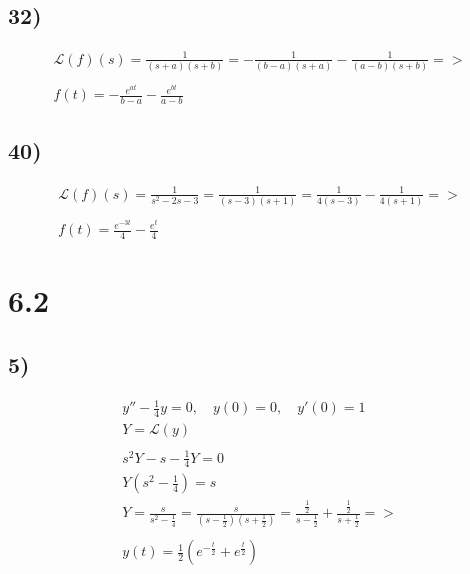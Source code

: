 \documentclass{article}
\newcommand{\paranth}[1]{\left( #1 \right)}
\newcommand{\laplace}[1]{\mathcal{L}\paranth{#1}}
\begin{document}
\subsection*{32)}

\begin{gather*}
	\laplace{f} \paranth{s} =
	\frac{1}{\paranth{s + a} \paranth{s + b}} =
	-\frac{1}{\paranth{b - a} \paranth{s + a}} - \frac{1}{\paranth{a - b} \paranth{s + b}} => \\ \\
	f\paranth{t} =
	-\frac{e^{a t}}{b - a}
	-\frac{e^{b t}}{a - b}
\end{gather*}


\subsection*{40)}

\begin{gather*}
	\laplace{f} (s) =
	\frac{1}{s^2 - 2 s - 3} =
	\frac{1}{\paranth{s - 3} \paranth{s + 1}} =
	\frac{1}{4 \paranth{s - 3}} - \frac{1}{4 \paranth{s + 1}} => \\ \\
	f (t) =
	\frac{e^{-3 t}}{4} - \frac{e^t}{4}
\end{gather*}


\section*{\textbf{6.2}}

\subsection*{5)}

\begin{gather*}
	y'' - \frac{1}{4} y = 0, \quad
	y(0) = 0, \quad
	y'(0) = 1 \\
	Y = \laplace{y} \\ \\
	s^2 Y - s - \frac{1}{4} Y = 0 \\
	Y \paranth{s^2 - \frac{1}{4}} = s \\
	Y = \frac{s}{s^2 - \frac{1}{4}} =
	\frac{s}{\paranth{s - \frac{1}{2}} \paranth{s + \frac{1}{2}}} =
	\frac{\frac{1}{2}}{s - \frac{1}{2}} + \frac{\frac{1}{2}}{s + \frac{1}{2}} => \\ \\
	y(t) = \frac{1}{2} \paranth{e^{-\frac{t}{2}} + e^{\frac{t}{2}}}
\end{gather*}
\end{document}
